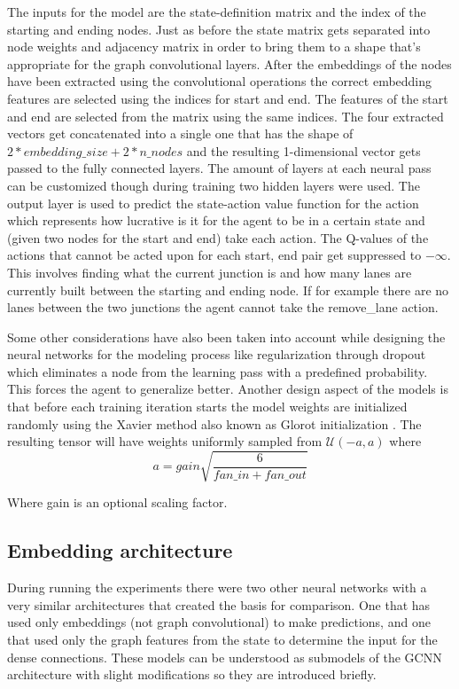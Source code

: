 \documentclass[
]{elteikthesis}[2023/04/10]
\begin{document}
The inputs for the model are the state-definition matrix and the index
of the starting and ending nodes. Just as before the state matrix
gets separated into node weights and adjacency matrix in order to
bring them to a shape that's appropriate for the graph convolutional
layers. After the embeddings of the nodes have been extracted using
the convolutional operations the correct embedding features are selected
using the indices for start and end. The features of the start and
end are selected from the matrix using the same indices. The four
extracted vectors get concatenated into a single one that has the
shape of $2*embedding\_size+2*n\_nodes$ and the resulting 1-dimensional
vector gets passed to the fully connected layers. The amount of layers
at each neural pass can be customized though during training two hidden
layers were used. The output layer is used to predict the state-action
value function for the action which represents how lucrative is it
for the agent to be in a certain state and (given two nodes for the
start and end) take each action. The Q-values of the actions that cannot
be acted upon for each start, end pair get suppressed to $-\infty$. This
involves finding what the current junction is and how many lanes are
currently built between the starting and ending node. If for example
there are no lanes between the two junctions the agent cannot take
the remove\_lane action.

Some other considerations have also been taken into account while
designing the neural networks for the modeling process like regularization
through dropout which eliminates a node from the learning pass with
a predefined probability. This forces the agent to generalize better.
Another design aspect of the models is that before each training iteration
starts the model weights are initialized randomly using the Xavier
method also known as Glorot initialization \cite{glorot2010understanding}.
The resulting tensor will have weights uniformly sampled from $\mathcal{U}(-a,a)$
where 
\begin{equation}
a=gain\sqrt{\frac{6}{fan\_in+fan\_out}}
\end{equation}

Where gain is an optional scaling factor.

\subsection{Embedding architecture}

During running the experiments there were two other neural networks
with a very similar architectures that created the basis for comparison.
One that has used only embeddings (not graph convolutional) to make
predictions, and one that used only the graph features from the state
to determine the input for the dense connections. These models can
be understood as submodels of the GCNN architecture with slight modifications
so they are introduced briefly.
\end{document}
